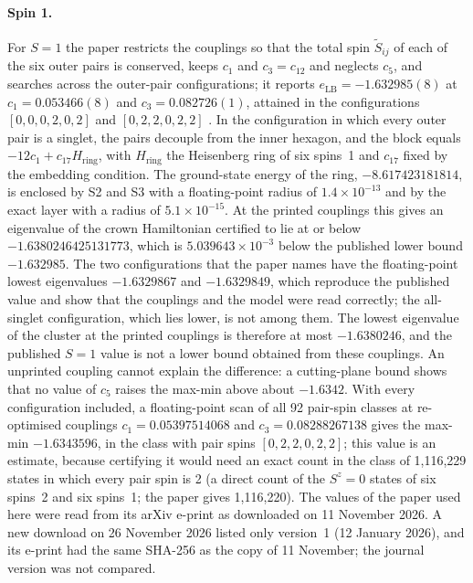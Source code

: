 \documentclass[11pt,a4paper]{article}
\newif\ifshowSone
\begin{document}
\ifshowSone
\paragraph{Spin 1.}
For $S=1$ the paper restricts the couplings so that the total spin $\tilde S_{ij}$ of each of the six outer pairs is
conserved, keeps $c_1$ and $c_3=c_{12}$ and neglects $c_5$, and searches across the outer-pair configurations; it
reports $e_{\mathrm{LB}}=-1.632985(8)$ at $c_1=0.053466(8)$ and $c_3=0.082726(1)$, attained in the configurations
$[0,0,0,2,0,2]$ and $[0,2,2,0,2,2]$ \cite{KranitzPenc2026}. In the configuration in which every outer pair is a
singlet, the pairs decouple from the inner hexagon, and the block equals $-12c_1+c_{17}H_{\mathrm{ring}}$, with
$H_{\mathrm{ring}}$ the Heisenberg ring of six spins~1 and $c_{17}$ fixed by the embedding condition. The
ground-state energy of the ring, $-8.617423181814$, is enclosed by S2 and S3 with a floating-point radius of
$1.4\times10^{-13}$ and by the exact layer with a radius of $5.1\times10^{-15}$. At the printed couplings this gives an
eigenvalue of the crown Hamiltonian certified to lie at or below $-1.6380246425131773$, which is
$5.039643\times10^{-3}$ below the published lower bound $-1.632985$. The two configurations that the paper names have
the floating-point lowest eigenvalues $-1.6329867$ and $-1.6329849$, which reproduce the published value and show that
the couplings and the model were read correctly; the all-singlet configuration, which lies lower, is not among them.
The lowest eigenvalue of the cluster at the printed couplings is therefore at most $-1.6380246$, and the published
$S=1$ value is not a lower bound obtained from these couplings. An unprinted coupling cannot explain the difference: a
cutting-plane bound shows that no value of $c_5$ raises the max-min above about $-1.6342$. With every configuration
included, a floating-point scan of all 92 pair-spin classes at re-optimised couplings $c_1=0.05397514068$ and
$c_3=0.08288267138$ gives the max-min $-1.6343596$, in the class with pair spins $[0,2,2,0,2,2]$; this value is an
estimate, because certifying it would need an exact count in the class of 1,116,229 states in which every pair spin is
2 (a direct count of the $S^z=0$ states of six spins~2 and six spins~1; the paper gives 1,116,220). The values of the
paper used here were read from its arXiv e-print as downloaded on 11 November 2026. A new download on 26 November 2026
listed only version~1 (12 January 2026), and its e-print had the same SHA-256 as the copy of 11 November; the journal
version \cite{KranitzPenc2026} was not compared.
\end{document}
